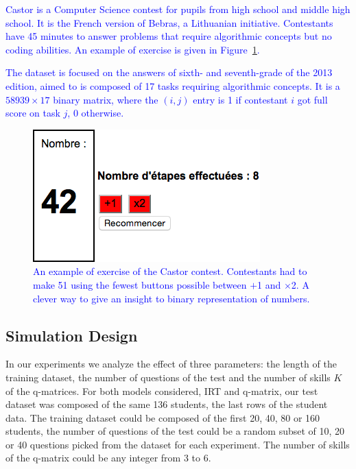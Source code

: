\documentclass{sig-alternate}
\newcommand\note[1]{\textcolor{blue}{#1}}
\begin{document}
\note{Castor is a Computer Science contest for pupils from high school and middle high school. It is the French version of Bebras, a Lithuanian initiative. Contestants have 45 minutes to answer problems that require algorithmic concepts but no coding abilities. An example of exercise is given in Figure~\ref{fig:51}.}

\note{The dataset is focused on the answers of sixth- and seventh-grade of the 2013 edition, aimed to is composed of 17 tasks requiring algorithmic concepts. It is a $58939 \times 17$ binary matrix, where the $(i, j)$ entry is 1 if contestant $i$ got full score on task $j$, 0 otherwise.}

\begin{figure}
\includegraphics[width=\linewidth]{51-calc}
\caption{\note{An example of exercise of the Castor contest. Contestants had to make 51 using the fewest buttons possible between $+$1 and $\times$2. A clever way to give an insight to binary representation of numbers.}}
\label{fig:51}
\end{figure}

\subsection{Simulation Design}

In our experiments we analyze the effect of three parameters: the length of the training dataset, the number of questions of the test and the number of skills $K$ of the q-matrices. For both models considered, IRT and q-matrix, our test dataset was composed of the same 136 students, the last rows of the student data. The training dataset could be composed of the first 20, 40, 80 or 160 students, the number of questions of the test could be a random subset of 10, 20 or 40 questions picked from the dataset for each experiment. The number of skills of the q-matrix could be any integer from 3 to 6.
\end{document}
